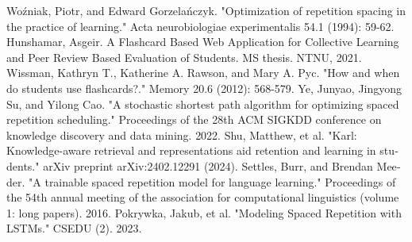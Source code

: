 \documentclass[12pt]{report}
\begin{document}
\begin{thebibliography}{MM}
    \begin{latin}
            Woźniak, Piotr, and Edward Gorzelańczyk. "Optimization of repetition spacing in the practice of learning." Acta neurobiologiae experimentalis 54.1 (1994): 59-62.        
            Hunshamar, Asgeir. A Flashcard Based Web Application for Collective Learning and Peer Review Based Evaluation of Students. MS thesis. NTNU, 2021.
            Wissman, Kathryn T., Katherine A. Rawson, and Mary A. Pyc. "How and when do students use flashcards?." Memory 20.6 (2012): 568-579.
            Ye, Junyao, Jingyong Su, and Yilong Cao. "A stochastic shortest path algorithm for optimizing spaced repetition scheduling." Proceedings of the 28th ACM SIGKDD conference on knowledge discovery and data mining. 2022.
            Shu, Matthew, et al. "Karl: Knowledge-aware retrieval and representations aid retention and learning in students." arXiv preprint arXiv:2402.12291 (2024).
            Settles, Burr, and Brendan Meeder. "A trainable spaced repetition model for language learning." Proceedings of the 54th annual meeting of the association for computational linguistics (volume 1: long papers). 2016.
            Pokrywka, Jakub, et al. "Modeling Spaced Repetition with LSTMs." CSEDU (2). 2023.

    \end{latin}
\end{thebibliography}
\end{document}
